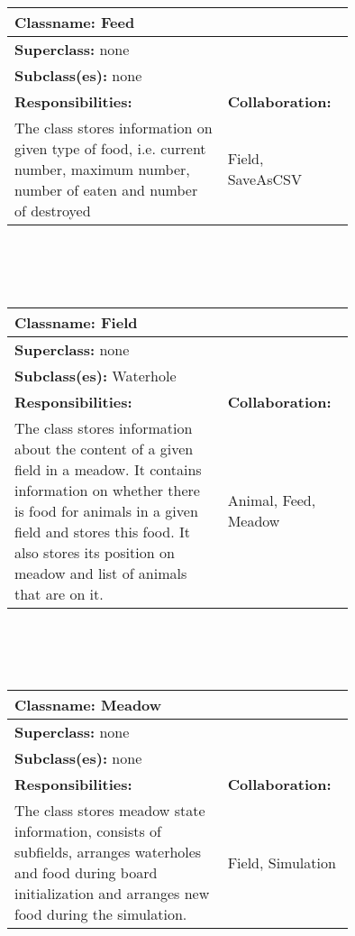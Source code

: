 \documentclass{article}
\begin{document}
\\ \\ \\
\begin{tabular}{|p{0.55\linewidth}|p{0.2\linewidth}|}
\hline
\multicolumn{2}{|l|}{\textbf{Classname:} Feed} \\
\hline
\multicolumn{2}{|l|}{\textbf{Superclass:} none} \\
\multicolumn{2}{|l|}{\textbf{Subclass(es):} none} \\
\hline
\textbf{Responsibilities:}  &  \textbf{Collaboration:} \\
The class stores information on given type of food, i.e. current number, maximum number, number of eaten and number of destroyed & Field, SaveAsCSV \\
\hline
\end{tabular}
\\ \\ \\
\begin{tabular}{|p{0.55\linewidth}|p{0.2\linewidth}|}
\hline
\multicolumn{2}{|l|}{\textbf{Classname:} Field} \\
\hline
\multicolumn{2}{|l|}{\textbf{Superclass:} none} \\
\multicolumn{2}{|l|}{\textbf{Subclass(es):} Waterhole} \\
\hline
\textbf{Responsibilities:}  &  \textbf{Collaboration:} \\
The class stores information about the content of a given field in a meadow. It contains information on whether there is food for animals in a given field and stores this food. It also stores its position on meadow and list of animals that are on it. & Animal, Feed, Meadow\\
\hline
\end{tabular}
\\ \\ \\
\begin{tabular}{|p{0.55\linewidth}|p{0.2\linewidth}|}
\hline
\multicolumn{2}{|l|}{\textbf{Classname:} Meadow} \\
\hline
\multicolumn{2}{|l|}{\textbf{Superclass:} none} \\
\multicolumn{2}{|l|}{\textbf{Subclass(es):} none} \\
\hline
\textbf{Responsibilities:}  &  \textbf{Collaboration:} \\
The class stores meadow state information, consists of subfields, arranges waterholes and food during board initialization and arranges new food during the simulation. & Field, Simulation \\
\hline
\end{tabular}
\end{document}

